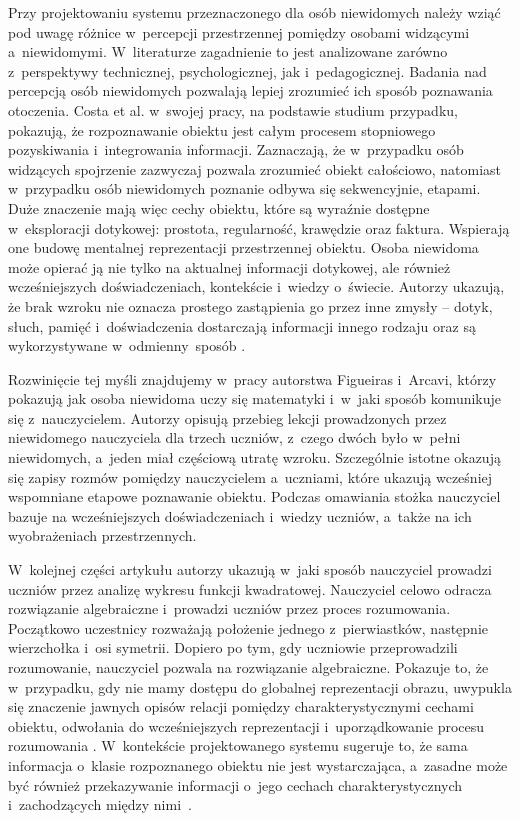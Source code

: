 Przy projektowaniu systemu przeznaczonego dla osób niewidomych należy wziąć pod uwagę różnice w~percepcji przestrzennej pomiędzy osobami widzącymi a~niewidomymi. W~literaturze zagadnienie to jest analizowane zarówno z~perspektywy technicznej, psychologicznej, jak i~pedagogicznej. Badania nad percepcją osób niewidomych pozwalają lepiej zrozumieć ich sposób poznawania otoczenia. Costa et al. w~swojej pracy, na podstawie studium przypadku, pokazują, że rozpoznawanie obiektu jest całym procesem stopniowego pozyskiwania i~integrowania informacji. Zaznaczają, że w~przypadku osób widzących spojrzenie zazwyczaj pozwala zrozumieć obiekt całościowo, natomiast w~przypadku osób niewidomych poznanie odbywa się sekwencyjnie, etapami. Duże znaczenie mają więc cechy obiektu, które są wyraźnie dostępne w~eksploracji dotykowej: prostota, regularność, krawędzie oraz faktura. Wspierają one budowę mentalnej reprezentacji przestrzennej obiektu. Osoba niewidoma może opierać ją nie tylko na aktualnej informacji dotykowej, ale również wcześniejszych doświadczeniach, kontekście i~wiedzy o~świecie. Autorzy ukazują, że brak wzroku nie oznacza prostego zastąpienia go przez inne zmysły -- dotyk, słuch, pamięć i~doświadczenia dostarczają informacji innego rodzaju oraz są wykorzystywane w~odmienny~sposób \cite{bib:spacialPerception}.

Rozwinięcie tej myśli znajdujemy w~pracy autorstwa Figueiras i~Arcavi, którzy pokazują jak osoba niewidoma uczy się matematyki i~w~jaki sposób komunikuje się z~nauczycielem. Autorzy opisują przebieg lekcji prowadzonych przez niewidomego nauczyciela dla trzech uczniów, z~czego dwóch było w~pełni niewidomych, a~jeden miał częściową utratę wzroku. Szczególnie istotne okazują się zapisy rozmów pomiędzy nauczycielem a~uczniami, które ukazują wcześniej wspomniane etapowe poznawanie obiektu. Podczas omawiania stożka nauczyciel bazuje na wcześniejszych doświadczeniach i~wiedzy uczniów, a~także na ich wyobrażeniach przestrzennych.

W~kolejnej części artykułu autorzy ukazują w~jaki sposób nauczyciel prowadzi uczniów przez analizę wykresu funkcji kwadratowej. Nauczyciel celowo odracza rozwiązanie algebraiczne i~prowadzi uczniów przez proces rozumowania. Początkowo uczestnicy rozważają położenie jednego z~pierwiastków, następnie wierzchołka i~osi symetrii. Dopiero po tym, gdy uczniowie przeprowadzili rozumowanie, nauczyciel pozwala na rozwiązanie algebraiczne. Pokazuje to, że w~przypadku, gdy nie mamy dostępu do globalnej reprezentacji obrazu, uwypukla się znaczenie jawnych opisów relacji pomiędzy charakterystycznymi cechami obiektu, odwołania do wcześniejszych reprezentacji i~uporządkowanie procesu rozumowania \cite{bib:learningToSee}. W~kontekście projektowanego systemu sugeruje to, że sama informacja o~klasie rozpoznanego obiektu nie jest wystarczająca, a~zasadne może być również przekazywanie informacji o~jego cechach charakterystycznych i~zachodzących między nimi~.

